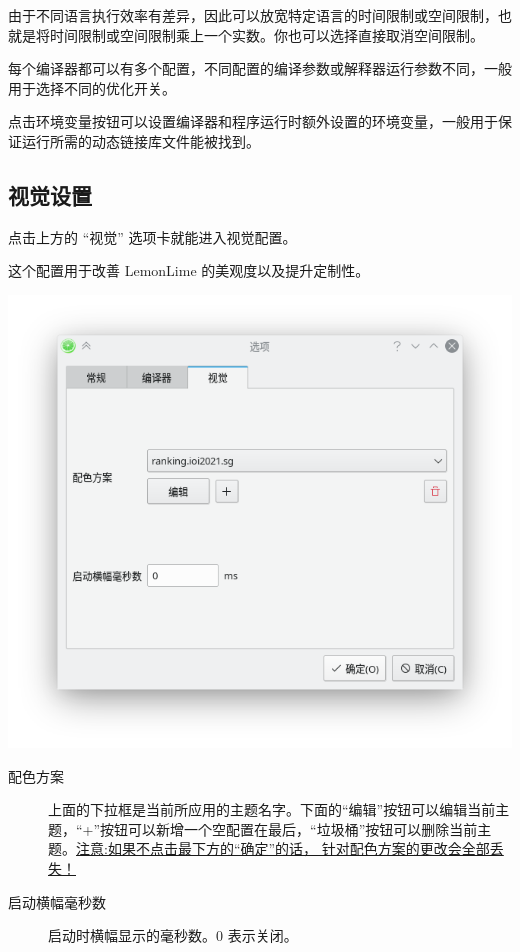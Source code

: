 \documentclass[UTF-8]{ctexart}
\begin{document}
				由于不同语言执行效率有差异，因此可以放宽特定语言的时间限制或空间限制，也就是将时间限制或空间限制乘上一个实数。你也可以选择直接取消空间限制。

				每个编译器都可以有多个配置，不同配置的编译参数或解释器运行参数不同，一般用于选择不同的优化开关。

				点击环境变量按钮可以设置编译器和程序运行时额外设置的环境变量，一般用于保证运行所需的动态链接库文件能被找到。


			\subsection{视觉设置}

				点击上方的 “视觉” 选项卡就能进入视觉配置。

				这个配置用于改善 LemonLime 的美观度以及提升定制性。

				\begin{center}
				\includegraphics[scale=0.7]{pics/visualmainsettings.png}
				\end{center}

				\begin{description}
					\item[配色方案] 上面的下拉框是当前所应用的主题名字。下面的“编辑”按钮可以编辑当前主题，“+”按钮可以新增一个空配置在最后，“垃圾桶”按钮可以删除当前主题。\uline{注意:如果不点击最下方的“确定”的话， 针对配色方案的更改会全部丢失！}
					\item[启动横幅毫秒数] 启动时横幅显示的毫秒数。0 表示关闭。
				\end{description}
			
\end{document}
